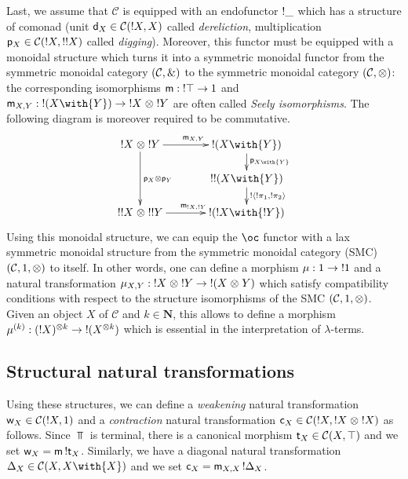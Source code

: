 \documentclass{LMCS}
\newcommand{\nat}{\mathbf{N}}
\newcommand{\With}[2]{{#1}\with{#2}}
\newcommand{\lam}{\ensuremath{\lambda}}
\newcommand{\Pair}[2]{\langle{#1},{#2}\rangle}
\newcommand{\scC}{\mathcal{C}}
\begin{document}
Last, we assume that $\scC$ is equipped with an endofunctor ${\mathord{!}}{\_}$ which has
a structure of comonad (unit $\Der X\in\scC(\Excl X,X)$ called
\emph{dereliction}, multiplication $\Digg X\in\scC(\Excl X,\Excl{\Excl X})$
called \emph{digging}). Moreover, this functor must be equipped with a monoidal
structure which turns it into a symmetric monoidal functor from the symmetric
monoidal category $(\scC,\IWith)$ to the symmetric monoidal category
$(\scC,\ITens)$: the corresponding isomorphisms $\mathsf m:{\mathord{!}}{\top}\to1$ and
$\Seely_{X,Y}:\Excl{(\With XY)}\to\Tens{\Excl X}{\Excl Y}$ are often called
\emph{Seely isomorphisms}. The following diagram is moreover required to be
commutative.
\begin{equation*}
\xymatrix @R=1.5em @C=3pc
  {\Tens{\Excl X}{\Excl Y}
    \ar[r]^{\Seely_{X,Y}}
    \ar[dd]^{\Tens{\Digg X}{\Digg Y}}
    & \Excl{(\With XY)}\ar[d]^{\Digg{\With XY}}\\
    &\Excl{\Excl{(\With XY)}}
    \ar[d]^{\Excl{\Pair{\Excl{\Proj 1}}{\Excl{\Proj 2}}}}\\
    \Tens{\Excl{\Excl X}}{\Excl{\Excl Y}}\ar[r]^{\Seely_{\Excl X,\Excl Y}}
    &\Excl{(\With{\Excl X}{\Excl Y})}
  }
\end{equation*}
  Using this monoidal structure, we can equip the $\oc$ functor with a lax
  symmetric monoidal structure from the symmetric monoidal category (SMC)
  $(\scC,\One,\ITens)$ to itself. In other words, one can define a morphism
  $\mu:1\to{\mathord{!}}{1}$ and a natural transformation
  $\mu_{X,Y}:{{\mathord{!}}{X}}\mathrel\otimes{{\mathord{!}}{Y}}\to{\mathord{!}}{({X}\mathrel\otimes{Y})}$ which satisfy
  compatibility conditions with respect to the structure isomorphisms of the SMC
  $(\scC,\One,\ITens)$. Given an object $X$ of $\scC$ and $k\in\nat$, this allows
  to define a morphism $\mu^{(k)}:({\mathord{!}}{X})^{\mathord\otimes k}\to{\mathord{!}}{(X^{\mathord\otimes k})}$ which is essential in the interpretation of \lam-terms.



\subsection{Structural natural transformations}
Using these structures, we can define a \emph{weakening} natural transformation
$\Weak X\in\scC(\Excl X,\One)$ and a \emph{contraction} natural transformation
$\Contr X\in\scC(\Excl X,\Tens{\Excl X}{\Excl X})$ as follows. Since $\Top$ is
terminal, there is a canonical morphism $\Termm_X\in\scC(X,\Top)$ and we set
$\mathsf w_{X}=\mathsf m\,{\mathord{!}}{\mathsf t_X}$. Similarly, we have a diagonal
natural transformation $\Diag X\in\scC(X,\With XX)$ and we set $\mathsf c_{X}={\mathsf m_{X,X}}\,{\mathord{!}}{\Delta_{X}}$.
\end{document}
